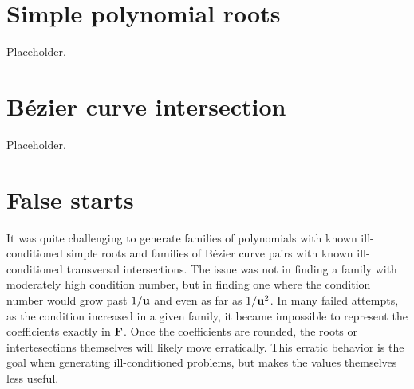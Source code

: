 \section{Simple polynomial roots}\label{sec:compensated-simple-roots}

Placeholder.

\section{B\'{e}zier curve intersection}\label{sec:compensated-curve-intersect}

Placeholder.

\section{False starts}\label{sec:false-starts}

It was quite challenging to generate families of polynomials with known
ill-conditioned simple roots and families of B\'{e}zier curve pairs with known
ill-conditioned transversal intersections. The issue was not in finding a
family with moderately high condition number, but in finding one where the
condition number would grow past \(1 / \mathbf{u}\) and even as far as
\(1 / \mathbf{u}^2\). In many failed attempts, as the condition increased
in a given family, it became impossible to represent the
coefficients exactly in \(\mathbf{F}\). Once the coefficients are rounded,
the roots or intertesections themselves will likely move erratically.
This erratic behavior is the goal when generating ill-conditioned problems,
but makes the values themselves less useful.

